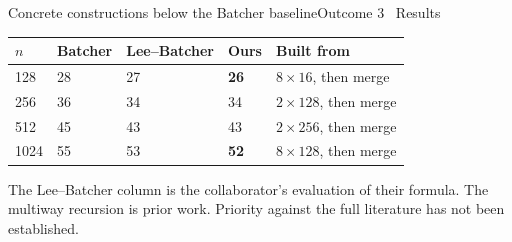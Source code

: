 \documentclass[aspectratio=169,9pt,xcolor=table]{beamer}
\begin{document}
\endgroup

\begin{frame}{Concrete constructions below the Batcher baseline}{Outcome 3 \textperiodcentered\ Results}
\begin{tabular}{p{}p{}p{}p{}p{}}
\toprule
$n$ & \textbf{Batcher} & \textbf{Lee--Batcher} & \textbf{Ours} & \textbf{Built from}\\
\midrule
\rowcolor{hl} 128 & 28 & 27 & \textbf{26} & $8\times 16$, then merge\\
256 & 36 & 34 & 34 & $2\times 128$, then merge\\
512 & 45 & 43 & 43 & $2\times 256$, then merge\\
\rowcolor{hl} 1024 & 55 & 53 & \textbf{52} & $8\times 128$, then merge\\
\bottomrule
\end{tabular}\par\vspace{0.4cm}
The Lee--Batcher column is the collaborator's evaluation of their formula. The multiway recursion is prior work. Priority against the full literature has not been established.
\end{frame}
\end{document}
